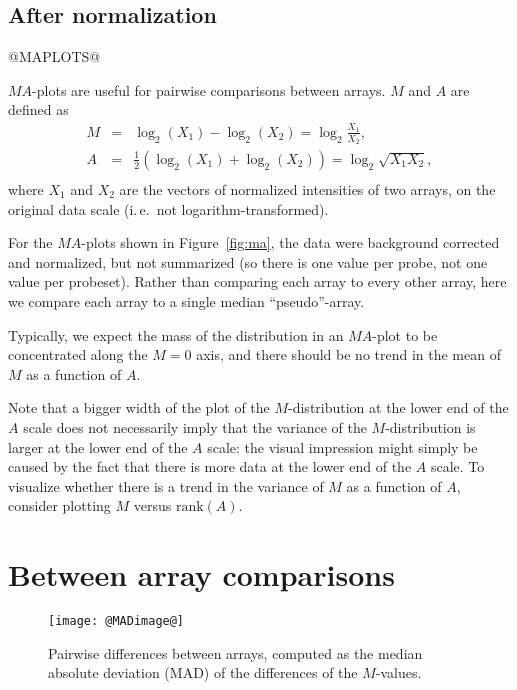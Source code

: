 \documentclass[11pt]{article}
\begin{document}
\subsection{After normalization}
@MAPLOTS@

$MA$-plots are useful for pairwise comparisons between arrays.
$M$ and $A$ are defined as 
\begin{eqnarray*}
M&=&\log_2(X_1)-\log_2(X_2)=\log_2\frac{X_1}{X_2},\\
A&=&\frac{1}{2}\left(\log_2(X_1)+\log_2(X_2)\right)=\log_2\sqrt{X_1X_2},\\
\end{eqnarray*}
where $X_1$ and $X_2$ are the vectors of normalized intensities of two arrays,
on the original data scale (i.\,e.\ not logarithm-transformed).

For the $MA$-plots shown in Figure~\ref{fig:ma},
the data were background corrected and normalized, 
but not summarized (so there is one value per probe, not one value
per probeset). Rather than comparing each array to every other array, 
here we compare each array to a single median ``pseudo''-array.

Typically, we expect the mass of the distribution in an $MA$-plot to
be concentrated along the $M=0$ axis, and there should be no trend in
the mean of $M$ as a function of $A$. 

Note that a bigger width of the plot of the $M$-distribution at the
lower end of the $A$ scale does not necessarily imply that the
variance of the $M$-distribution is larger at the lower end of the
$A$ scale: the visual impression might simply be caused by the fact
that there is more data at the lower end of the $A$ scale. To
visualize whether there is a trend in the variance of $M$ as a function of $A$,
consider plotting $M$ versus $\mbox{rank}(A)$.

\section{Between array comparisons}
\begin{figure}[tp]
  \centering
\texttt{[image: @MADimage@]}
\caption{\label{fig:MADimage}%
Pairwise differences between arrays, computed as the median absolute 
deviation (MAD) of the differences of the $M$-values.}
\end{figure}
\end{document}

